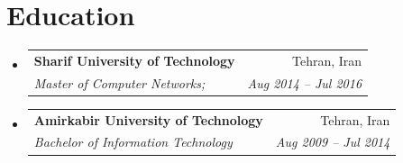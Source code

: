 \documentclass[letterpaper,11pt]{article}
\makeatletter
\newcommand{\resumeSubheading}[4]{
  \vspace{-1pt}\item
    \begin{tabular*}{0.97\textwidth}[t]{l@{\extracolsep{\fill}}r}
      \textbf{#1} & #2 \\
      \textit{\small#3} & \textit{\small #4} \\
    \end{tabular*}\vspace{-5pt}
}
\newcommand{\resumeSubHeadingListStart}{\begin{itemize}[leftmargin=*]}
\newcommand{\resumeSubHeadingListEnd}{\end{itemize}}
\makeatother
\begin{document}
\section{Education}
  \resumeSubHeadingListStart
    \resumeSubheading
      {Sharif University of Technology}{Tehran, Iran}
      {Master of Computer Networks;}{Aug 2014 -- Jul 2016}
    \resumeSubheading
      {Amirkabir University of Technology}{Tehran, Iran}
      {Bachelor of Information Technology}{Aug 2009 -- Jul 2014}
  \resumeSubHeadingListEnd

\end{document}
